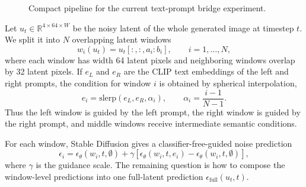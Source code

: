 \documentclass[10pt,conference,compsocconf]{IEEEtran}
\begin{document}
\begin{figure}[h]
\centering
{}
\caption{Compact pipeline for the current text-prompt bridge experiment.}
\label{fig:method-pipeline}
\vspace{-2mm}
\end{figure}


Let $u_t\in\mathbb{R}^{4\times64\times W}$ be the noisy latent of the whole generated image at timestep $t$.
We split it into $N$ overlapping latent windows
\begin{equation}
    w_i(u_t) = u_t[:, :, a_i:b_i], \qquad i=1,\ldots,N,
\end{equation}
where each window has width 64 latent pixels and neighboring windows overlap by 32 latent pixels.
If $e_L$ and $e_R$ are the CLIP text embeddings of the left and right prompts, the condition for window $i$ is obtained by spherical interpolation,
\begin{equation}
    e_i = \mathrm{slerp}\!\left(e_L,e_R,\alpha_i\right),\qquad
\alpha_i=\frac{i-1}{N-1}.
\end{equation}
Thus the left window is guided by the left prompt, the right window is guided by the right prompt, and middle windows receive intermediate semantic conditions.

For each window, Stable Diffusion gives a classifier-free-guided noise prediction
\begin{equation}
\epsilon_i = \epsilon_\theta(w_i,t,\emptyset) + \gamma\left[ \epsilon_\theta(w_i,t,e_i)-\epsilon_\theta(w_i,t,\emptyset) \right],
\end{equation}
where $\gamma$ is the guidance scale.
The remaining question is how to compose the window-level predictions into one full-latent prediction
$\epsilon_{\mathrm{full}}(u_t,t)$.
\end{document}
